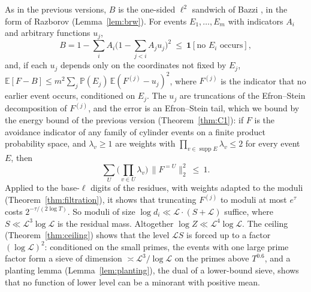 \documentclass[11pt,reqno]{amsart}
\theoremstyle{definition}
\newcommand{\Lc}{\mathcal L}
\newcommand{\E}{\mathbb E}
\newcommand{\PP}{\mathbb P}
\newcommand{\supp}{\operatorname{supp}}
\begin{document}
As in the previous versions, $B$ is the one-sided $\ell^2$ sandwich of Bazzi
\cite{Bazzi}, in the form of Razborov \cite{Razborov} (Lemma~\ref{lem:brw}).
For events $E_1,\dots,E_m$ with indicators $A_i$ and arbitrary functions $u_j$,
\[
 B=1-\sum_iA_i\Big(1-\sum_{j<i}A_ju_j\Big)^2\ \le\ \mathbf 1[\text{no }E_i\text{ occurs}],
\]
and, if each $u_j$ depends only on the coordinates not fixed by $E_j$,
$\E[F-B]\le m^2\sum_j\PP(E_j)\,\E(F^{(j)}-u_j)^2$, where $F^{(j)}$ is the
indicator that no earlier event occurs, conditioned on $E_j$.  The $u_j$ are
truncations of the Efron--Stein decomposition of $F^{(j)}$, and the error is
an Efron--Stein tail, which we bound by the energy bound of the previous
version (Theorem~\ref{thm:C1}): if $F$ is the avoidance indicator of any
family of cylinder events on a finite product probability space, and
$\lambda_v\ge1$ are weights with $\prod_{v\in\supp E}\lambda_v\le2$ for every event
$E$, then
\[
 \sum_{U}\Big(\prod_{v\in U}\lambda_v\Big)\,\|F^{=U}\|_2^2\ \le\ 1 .
\]
Applied to the base-$\ell$ digits of the residues, with weights adapted to
the moduli (Theorem~\ref{thm:filtration}), it shows that truncating $F^{(j)}$
to moduli at most $e^{\tau}$ costs $2^{-\tau/(2\log T)}$.  So moduli of size
$\log d_i\ll\Lc\cdot(S+\Lc)$ suffice, where $S\ll\Lc^3\log\Lc$ is the residual mass.
Altogether $\log Z\ll\Lc^4\log\Lc$.  The ceiling (Theorem~\ref{thm:ceiling})
shows that the level $\Lc S$ is forced up to a factor $(\log\Lc)^2$: conditioned on the small primes,
the events with one large prime factor form a sieve of dimension
$\asymp\Lc^3/\log\Lc$ on the primes above $T^{0.6}$, and a planting lemma
(Lemma~\ref{lem:planting}), the dual of a lower-bound sieve, shows that no
function of lower level can be a minorant with positive mean.
\end{document}

